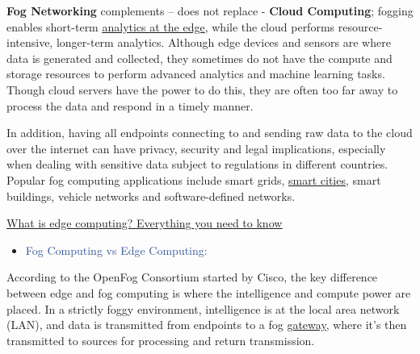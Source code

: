 \documentclass[11pt]{article}
\begin{document}
\textbf{Fog Networking} complements – does not replace - \textbf{Cloud Computing}; fogging enables short-term \href{https://www.techtarget.com/iotagenda/photostory/450432721/IoT-predictions-2018-What-will-the-next-year-of-connectedness-bring/1/IoT-edge-analytics-brings-real-time-intelligence-to-devices?_gl=1*stx4xr*_ga*MTY4NTMwOTYuMTYzNDEyODU1MQ..*_ga_TQKE4GS5P9*MTY1MTc1NTYwNS40LjEuMTY1MTc1NjU3OS4w&_ga=2.257025675.1003404945.1651755607-16853096.1634128551}{\uline{analytics at the edge}}, while the cloud performs resource-intensive, longer-term analytics. Although edge devices and sensors are where data is generated and collected, they sometimes do not have the compute and storage resources to perform advanced analytics and machine learning tasks. Though cloud servers have the power to do this, they are often too far away to process the data and respond in a timely manner.
	
In addition, having all endpoints connecting to and sending raw data to the cloud over the internet can have privacy, security and legal implications, especially when dealing with sensitive data subject to regulations in different countries. Popular fog computing applications include smart grids, \href{https://www.techtarget.com/iotagenda/definition/smart-city?_gl=1*1kekfno*_ga*MTY4NTMwOTYuMTYzNDEyODU1MQ..*_ga_TQKE4GS5P9*MTY1MTc1NTYwNS40LjEuMTY1MTc1Njg1My4w&_ga=2.257025675.1003404945.1651755607-16853096.1634128551}{\uline{smart cities}}, smart buildings, vehicle networks and software-defined networks.
	
\href{https://www.techtarget.com/searchdatacenter/definition/edge-computing}{\uline{What is edge computing? Everything you need to know}}
	
\vspace{1\baselineskip}
\begin{itemize}
\item {\Large \textcolor[HTML]{2F5496}{Fog Computing vs Edge Computing:}}
\end{itemize}

According to the OpenFog Consortium started by Cisco, the key difference between edge and fog computing is where the intelligence and compute power are placed. In a strictly foggy environment, intelligence is at the local area network (LAN), and data is transmitted from endpoints to a fog \href{https://www.techtarget.com/iotagenda/definition/gateway?_gl=1*aq5hgq*_ga*MTY4NTMwOTYuMTYzNDEyODU1MQ..*_ga_TQKE4GS5P9*MTY1MTc1NTYwNS40LjEuMTY1MTc1ODEwMi4w&_ga=2.259721994.1003404945.1651755607-16853096.1634128551}{\uline{gateway}}, where it's then transmitted to sources for processing and return transmission.
\end{document}
